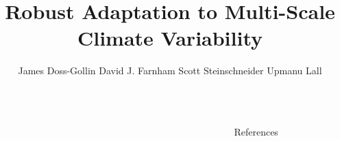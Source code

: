 \documentclass[serif,mathserif,final]{beamer}
\title{Robust Adaptation to Multi-Scale Climate Variability}
\author{James Doss-Gollin\inst{1} \quad David J. Farnham\inst{2} \quad Scott Steinschneider\inst{3} \quad Upmanu Lall\inst{1}}
\institute
{\inst{1} Department of Earth and Environmental Engineering Columbia University \inst{2} Carnegie Institution for Science \inst{3} Department of Biological and Environmental Engineering, Cornell University}
\begin{document}
\begin{frame}{}
  \begin{columns}[t]

    \begin{column}{0.22\linewidth}

        
        
        

    \end{column}%

    \begin{column}{0.22\linewidth}

      
      
      
    \end{column}%

    \begin{column}{0.22\linewidth}

      
      

    \end{column}%


    \begin{column}{0.22\linewidth}

      
      \begin{block}{References}
        \renewcommand*{\bibfont}{\footnotesize}
        \printbibliography[heading=none]
      \end{block}
  

    \end{column}%

  \end{columns}
\end{frame}
\end{document}
